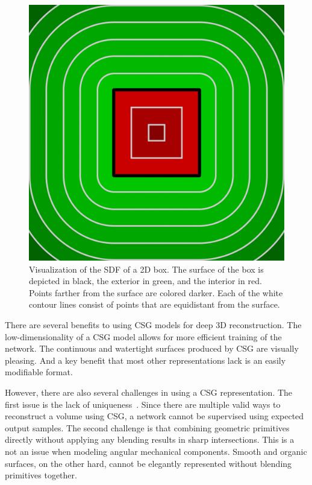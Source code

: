 \begin{figure}
	\centering
	\includegraphics[scale=0.2]{Images/SDF Box}
	\caption{Visualization of the SDF of a 2D box. The surface of the box is depicted in black, the exterior in green, and the interior in red. Points farther from the surface are colored darker. Each of the white contour lines consist of points that are equidistant from the surface.}
	\label{fig:sdf_box}
\end{figure}

There are several benefits to using CSG models for deep 3D reconstruction. The low-dimensionality of a CSG model allows for more efficient training of the network. The continuous and watertight surfaces produced by CSG are visually pleasing. And a key benefit that most other representations lack is an easily modifiable format.

However, there are also several challenges in using a CSG representation. The first issue is the lack of uniqueness~\cite{Hughes2013}. Since there are multiple valid ways to reconstruct a volume using CSG, a network cannot be supervised using expected output samples. The second challenge is that combining geometric primitives directly without applying any blending results in sharp intersections. This is a not an issue when modeling angular mechanical components. Smooth and organic surfaces, on the other hard, cannot be elegantly represented without blending primitives together.


